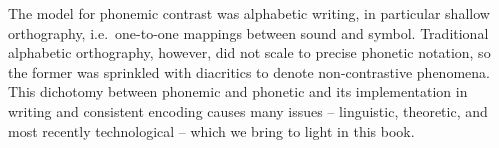 The model for phonemic contrast was alphabetic writing, in particular shallow
orthography, i.e.\ one-to-one mappings between sound and symbol. Traditional
alphabetic orthography, however, did not scale to precise phonetic notation, so
the former was sprinkled with diacritics to denote non-contrastive phenomena.
This dichotomy between phonemic and phonetic and its implementation in writing
and consistent encoding causes many issues -- linguistic, theoretic, and most
recently technological -- which we bring to light in this book.
